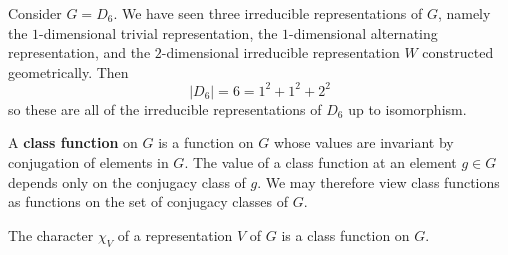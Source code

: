 \begin{example}
Consider $G=D_6$.  We have seen three irreducible representations of $G$, namely the $1$-dimensional trivial representation, the $1$-dimensional alternating representation, and the $2$-dimensional irreducible representation $W$ constructed geometrically.  Then
\[ |D_6| = 6 = 1^2 + 1^2 +2^2 \]
so these are all of the irreducible representations of $D_6$ up to isomorphism.
\end{example}

\begin{defn}
A \textbf{class function} on $G$ is a function on $G$ whose values are invariant by conjugation of elements in $G$.  The value of a class function at an element $g \in G$ depends only on the conjugacy class of $g$.  We may therefore view class functions as functions on the set of conjugacy classes of $G$.
\end{defn}
\begin{note}
The character $\chi_V$ of a representation $V$ of $G$ is a class function on $G$.
\end{note}